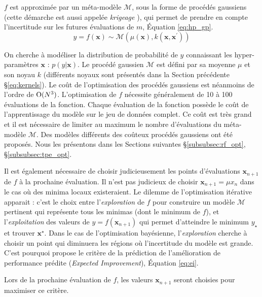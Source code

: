 $f$ est approximée par un méta-modèle $\mathcal{M}$, sous la forme de procédés gaussiens \cite{matheron_principles_1963} (cette démarche est aussi appelée \textit{krigeage} \cite{krige_statistical_1951}), qui permet de prendre en compte l'incertitude sur les futures évaluations de $m$, Équation \ref{eq:hp_gp}.
\begin{equation} \label{eq:hp_gp}
y = f(\boldsymbol{x}) \sim \mathcal{M}\left(\mu(\boldsymbol{x}), k\left(\boldsymbol{x}, \boldsymbol{x}^{\prime}\right)\right)
\end{equation}

On cherche à modéliser la distribution de probabilité de $y$ connaissant les hyper-paramètres $\boldsymbol{x}$ : $p(y | \boldsymbol{x})$.
Le procédé gaussien $\mathcal{M}$ est défini par sa moyenne $\mu$ et son noyau $k$ (différents noyaux sont présentés dans la Section précédente §\ref{eq:kernels}).
Le coût de l'optimisation des procédés gaussiens est néanmoins de l'ordre de $\operatorname{O}(N^3)$.
L'optimisation de $f$ nécessite généralement de 10 à 100 évaluations de la fonction.
Chaque évaluation de la fonction possède le coût de l'apprentissage du modèle sur le jeu de données complet.
Ce coût est très grand et il est nécessaire de limiter au maximum le nombre d'évaluations du méta-modèle $\mathcal{M}$.
Des modèles différents des coûteux procédés gaussiens ont été proposés.
Nous les présentons dans les Sections suivantes §\ref{subsubsec:rf_opt}, §\ref{subsubsec:tpe_opt}.

Il est également nécessaire de choisir judicieusement les points d'évaluations $\boldsymbol{x}_{n+1}$ de $f$ à la prochaine évaluation.
Il n'est pas judicieux de choisir $\boldsymbol{x}_{n+1} = \mu{x_{n}}$ dans le cas où des minima locaux existeraient.
Le dilemme de l'optimisation itérative apparait : c'est le choix entre l'\textit{exploration} de $f$ pour construire un modèle $\mathcal{M}$ pertinent qui représente tous les minimas (dont le minimum de $f$), et l'\textit{exploitation} des valeurs de $y = f(\boldsymbol{x}_{n+1})$ qui permet d'atteindre le minimum $y_{\star}$ et trouver $\boldsymbol{x}^{\star}$.
Dans le cas de l'optimisation bayésienne, l'\textit{exploration} cherche à choisir un point qui diminuera les régions où l'incertitude du modèle est grande.
C'est pourquoi \cite{jones_efficient_1998} propose le critère de la prédiction de l'amélioration de performance prédite (\textit{Expected Improvement}), Équation \ref{eq:ei}.

 Lors de la prochaine évaluation de $f$, les valeurs $\boldsymbol{x}_{n+1}$ seront choisies pour maximiser ce critère.

